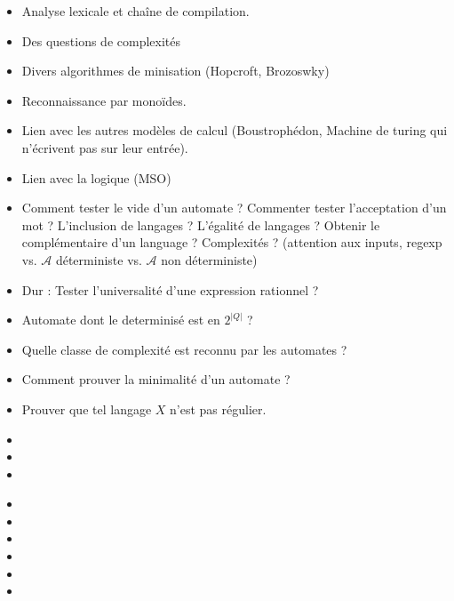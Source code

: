 \documentclass{agregfiche}
\begin{document}
\secidees
\begin{itemize}
\item Analyse lexicale et chaîne de compilation.
\item Des questions de complexités
\item Divers algorithmes de minisation (Hopcroft, Brozoswky)
\item Reconnaissance par monoïdes.
\item Lien avec les autres modèles de calcul (Boustrophédon, Machine de turing
    qui n'écrivent pas sur leur entrée).
\item Lien avec la logique (MSO)
\end{itemize}



\secquestionsclassiques
\begin{itemize}
\item Comment tester le vide d'un automate ? Commenter tester l'acceptation d'un mot ? L'inclusion de langages ? L'égalité de langages ? Obtenir le complémentaire d'un language ? Complexités ? (attention aux inputs, regexp vs. $\mathcal{A}$ déterministe vs. $\mathcal{A}$ non déterministe)
\item Dur : Tester l'universalité d'une expression rationnel ?
\item Automate dont le determinisé est en $2^{|Q|}$ ?
\item Quelle classe de complexité est reconnu par les automates ?
\item Comment prouver la minimalité d'un automate ?
\item Prouver que tel langage $X$ n'est pas régulier.
\end{itemize}

\secreferences
\begin{itemize}
\item 
\item {}
\item {}
\end{itemize}

\secdev
\begin{itemize}
\item 
\item 
\item 
\item {}
\item {}
\item {}

\end{itemize}
\end{document}
